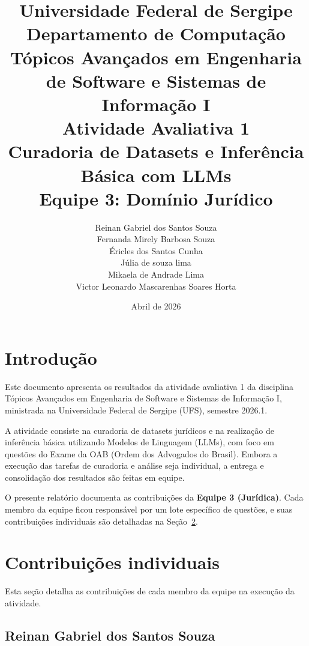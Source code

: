 \documentclass[12pt,a4paper]{article}
\title{%
  \vspace{-1cm}
  \large\textbf{Universidade Federal de Sergipe}\\[0.3cm]
  \normalsize Departamento de Computação\\
  Tópicos Avançados em Engenharia de Software e Sistemas de Informação I\\[1cm]
  \Large\textbf{Atividade Avaliativa 1}\\[0.3cm]
  \large Curadoria de Datasets e Inferência Básica com LLMs\\[0.3cm]
  \normalsize Equipe 3: Domínio Jurídico
}
\author{
  Reinan Gabriel dos Santos Souza \\
  Fernanda Mirely Barbosa Souza \\
  Éricles dos Santos Cunha \\
  Júlia de souza lima \\
  Mikaela de Andrade Lima \\
  Victor Leonardo Mascarenhas Soares Horta
}
\date{Abril de 2026}
\begin{document}
\maketitle
\thispagestyle{empty}

\begin{center}
\end{center}

\vspace{0.5cm}
\newpage

\tableofcontents
\newpage

\section{Introdução}

Este documento apresenta os resultados da atividade avaliativa 1 da disciplina Tópicos Avançados em Engenharia de Software e Sistemas de Informação I, ministrada na Universidade Federal de Sergipe (UFS), semestre 2026.1.

A atividade consiste na curadoria de datasets jurídicos e na realização de inferência básica utilizando Modelos de Linguagem (LLMs), com foco em questões do Exame da OAB (Ordem dos Advogados do Brasil). Embora a execução das tarefas de curadoria e análise seja individual, a entrega e consolidação dos resultados são feitas em equipe.

O presente relatório documenta as contribuições da \textbf{Equipe 3 (Jurídica)}. Cada membro da equipe ficou responsável por um lote específico de questões, e suas contribuições individuais são detalhadas na Seção~\ref{sec:contribuicoes}.

\section{Contribuições individuais}
\label{sec:contribuicoes}

Esta seção detalha as contribuições de cada membro da equipe na execução da atividade.

\subsection{Reinan Gabriel dos Santos Souza}
\end{document}
